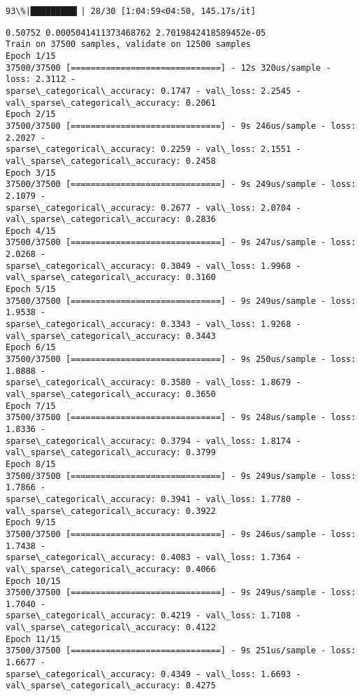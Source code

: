 \documentclass[11pt]{article}
\begin{document}
    \begin{Verbatim}[commandchars=\\\{\}]
 93\%|█████████▎| 28/30 [1:04:59<04:50, 145.17s/it]
    \end{Verbatim}

    \begin{Verbatim}[commandchars=\\\{\}]
0.50752 0.0005041411373468762 2.7019842418589452e-05
Train on 37500 samples, validate on 12500 samples
Epoch 1/15
37500/37500 [==============================] - 12s 320us/sample - loss: 2.3112 -
sparse\_categorical\_accuracy: 0.1747 - val\_loss: 2.2545 -
val\_sparse\_categorical\_accuracy: 0.2061
Epoch 2/15
37500/37500 [==============================] - 9s 246us/sample - loss: 2.2027 -
sparse\_categorical\_accuracy: 0.2259 - val\_loss: 2.1551 -
val\_sparse\_categorical\_accuracy: 0.2458
Epoch 3/15
37500/37500 [==============================] - 9s 249us/sample - loss: 2.1079 -
sparse\_categorical\_accuracy: 0.2677 - val\_loss: 2.0704 -
val\_sparse\_categorical\_accuracy: 0.2836
Epoch 4/15
37500/37500 [==============================] - 9s 247us/sample - loss: 2.0268 -
sparse\_categorical\_accuracy: 0.3049 - val\_loss: 1.9968 -
val\_sparse\_categorical\_accuracy: 0.3160
Epoch 5/15
37500/37500 [==============================] - 9s 249us/sample - loss: 1.9538 -
sparse\_categorical\_accuracy: 0.3343 - val\_loss: 1.9268 -
val\_sparse\_categorical\_accuracy: 0.3443
Epoch 6/15
37500/37500 [==============================] - 9s 250us/sample - loss: 1.8888 -
sparse\_categorical\_accuracy: 0.3580 - val\_loss: 1.8679 -
val\_sparse\_categorical\_accuracy: 0.3650
Epoch 7/15
37500/37500 [==============================] - 9s 248us/sample - loss: 1.8336 -
sparse\_categorical\_accuracy: 0.3794 - val\_loss: 1.8174 -
val\_sparse\_categorical\_accuracy: 0.3799
Epoch 8/15
37500/37500 [==============================] - 9s 249us/sample - loss: 1.7866 -
sparse\_categorical\_accuracy: 0.3941 - val\_loss: 1.7780 -
val\_sparse\_categorical\_accuracy: 0.3922
Epoch 9/15
37500/37500 [==============================] - 9s 246us/sample - loss: 1.7438 -
sparse\_categorical\_accuracy: 0.4083 - val\_loss: 1.7364 -
val\_sparse\_categorical\_accuracy: 0.4066
Epoch 10/15
37500/37500 [==============================] - 9s 249us/sample - loss: 1.7040 -
sparse\_categorical\_accuracy: 0.4219 - val\_loss: 1.7108 -
val\_sparse\_categorical\_accuracy: 0.4122
Epoch 11/15
37500/37500 [==============================] - 9s 251us/sample - loss: 1.6677 -
sparse\_categorical\_accuracy: 0.4349 - val\_loss: 1.6693 -
val\_sparse\_categorical\_accuracy: 0.4275

\end{Verbatim}
\end{document}
